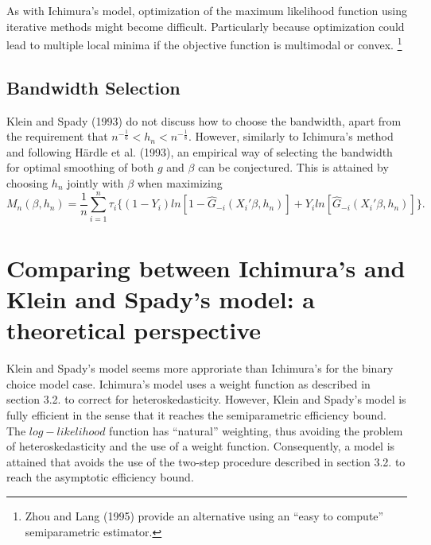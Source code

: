 \documentclass[a4paper]{article}
\begin{document}
As with Ichimura's model, optimization of the maximum likelihood function using iterative methods might become difficult.  Particularly because optimization could lead to multiple local minima if the objective function is multimodal or convex. \footnote{Zhou and Lang (1995) provide an alternative using an ``easy to compute'' semiparametric estimator.}

\subsection{Bandwidth Selection} %
\label{sub:Bandwidth Selection}

Klein and Spady (1993) do not discuss how to choose the bandwidth, apart from the requirement that $ n^{-\frac{1}{6}} < h_n < n^{-\frac{1}{8}}$. However, similarly to Ichimura's method and following H{\"a}rdle et al. (1993), an empirical way of selecting the bandwidth for optimal smoothing of both $g$ and $\beta$ can be conjectured. This is attained by choosing $h_n$ jointly with $\beta$ when maximizing
\begin{equation}
M_n(\beta, h_n) = \frac{1}{n}\sum_{i=1}^n \tau_{i}\{ (1 - Y_i)ln[ 1 - \hat{G}_{-i}(X_i'\beta, h_n)] +  Y_iln[\hat{G}_{-i}(X_i'\beta, h_n)]\}.
\end{equation}


\section{Comparing between Ichimura's and Klein and Spady's model: a theoretical perspective} %
\label{sec:Comparing between Ichimura's and Klein and Spady's model: a theoretical perspective}

Klein and Spady's model seems more approriate than Ichimura's for the binary choice model case. Ichimura's model uses a weight function as described in section 3.2. to correct for heteroskedasticity. However, Klein and Spady's model is fully efficient in the sense that it reaches the semiparametric efficiency bound.  The $log-likelihood$ function has ``natural'' weighting, thus avoiding the problem of heteroskedasticity and the use of a weight function.  Consequently, a model is attained that avoids the use of the two-step procedure described in section 3.2. to reach the asymptotic efficiency bound. 

\newpage 


\end{document}
